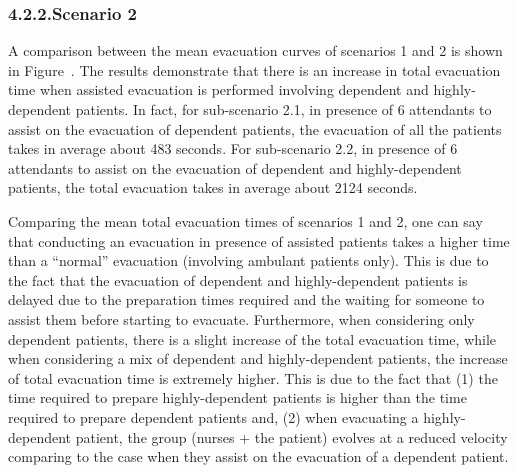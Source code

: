 \documentclass{style/llncs}
\begin{document}
\subsubsection{4.2.2.\hspace*{0.5em}Scenario 2}\label{path-s2}%

\noindent{}A comparison between the mean evacuation curves of scenarios 1 and 2
is shown in Figure~. The results demonstrate that there is an
increase in total evacuation time when assisted evacuation is performed
involving dependent and highly-dependent patients. In fact, for
sub-scenario 2.1, in presence of 6 attendants to assist on the evacuation
of dependent patients, the evacuation of all the patients takes in
average about 483 seconds. For sub-scenario 2.2, in presence of 6
attendants to assist on the evacuation of dependent and highly-dependent
patients, the total evacuation takes in average about 2124 seconds.%

Comparing the mean total evacuation times of scenarios 1 and 2, one can
say that conducting an evacuation in presence of assisted patients
takes a higher time than a \textquotedblleft{}normal\textquotedblright{} evacuation (involving ambulant patients only). This is due to the fact
that the evacuation of dependent and highly-dependent patients is delayed
due to the preparation times required and the waiting for someone to assist them before starting to evacuate.
Furthermore, when considering only dependent patients, there is a slight increase of the total evacuation time, while when considering a mix of dependent and highly-dependent patients, the increase of total evacuation time is extremely higher. This is due to the fact that (1) the time required to prepare highly-dependent patients is higher than the time required to prepare dependent patients and, (2) when evacuating a highly-dependent patient, the group (nurses + the patient) evolves at a reduced velocity comparing to the case when they assist on the evacuation of a dependent patient.%
\end{document}
